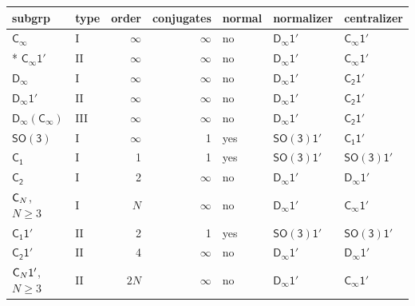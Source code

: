 \documentclass[10pt,a4paper]{article}
\makeatletter
\def\grouprule#1#2{\noalign{\marks\LTgroupmarks{\the\belowrulesep}\nobreak\vskip#1%
  \vskip\aboverulesep}\multispan\LT@cols\unskip{\leaders\hrule\@height#2\hfill\kern\z@}\cr
  \noalign{\penalty\LTrulebreak\vskip\belowrulesep\global\@lastruleclass\z@}}
\numberwithin{equation}{section}
\newcommand{\grp}[1]{\mathsf{#1}}
\makeatother
\begin{document}
{\small\begin{longtable}{@{}llrrlll@{}}\toprule
subgrp & type & order & conjugates & normal & normalizer & centralizer\\\midrule\endhead
\bottomrule\endfoot\endlastfoot
\href{../../../rotation/data/pdf/Cinf.pdf}{$\grp{C_{\infty}}$} & I & $\infty$ & $\infty$ & no & \href{Dinf-1p.pdf}{$\grp{D_{\infty}1'}$} & \href{Cinf-1p.pdf}{$\grp{C_{\infty}1'}$}\\*
\href{Cinf-1p.pdf}{$\grp{C_{\infty}1'}$} & II & $\infty$ & $\infty$ & no & \href{Dinf-1p.pdf}{$\grp{D_{\infty}1'}$} & \href{Cinf-1p.pdf}{$\grp{C_{\infty}1'}$}\\
\href{../../../rotation/data/pdf/Dinf.pdf}{$\grp{D_{\infty}}$} & I & $\infty$ & $\infty$ & no & \href{Dinf-1p.pdf}{$\grp{D_{\infty}1'}$} & \href{C2-1p.pdf}{$\grp{C_{2}1'}$}\\
\href{Dinf-1p.pdf}{$\grp{D_{\infty}1'}$} & II & $\infty$ & $\infty$ & no & \href{Dinf-1p.pdf}{$\grp{D_{\infty}1'}$} & \href{C2-1p.pdf}{$\grp{C_{2}1'}$}\\
\href{Dinf-Cinf.pdf}{$\grp{D_{\infty}}(\grp{C_{\infty}})$} & III & $\infty$ & $\infty$ & no & \href{Dinf-1p.pdf}{$\grp{D_{\infty}1'}$} & \href{C2-1p.pdf}{$\grp{C_{2}1'}$}\\
\href{../../../rotation/data/pdf/SO3.pdf}{$\grp{SO(3)}$} & I & $\infty$ & 1 & yes & \href{SO3-1p.pdf}{$\grp{SO(3)1'}$} & \href{C1-1p.pdf}{$\grp{C_{1}1'}$}\\
\grouprule{0pt}{\lightrulewidth}
\href{../../../rotation/data/pdf/C1.pdf}{$\grp{C_{1}}$} & I & 1 & 1 & yes & \href{SO3-1p.pdf}{$\grp{SO(3)1'}$} & \href{SO3-1p.pdf}{$\grp{SO(3)1'}$}\\
\href{../../../rotation/data/pdf/C2.pdf}{$\grp{C_{2}}$} & I & 2 & $\infty$ & no & \href{Dinf-1p.pdf}{$\grp{D_{\infty}1'}$} & \href{Dinf-1p.pdf}{$\grp{D_{\infty}1'}$}\\
$\grp{C_{\mathnormal{N}}}$, $N \ge 3$ & I & $N$ & $\infty$ & no & \href{Dinf-1p.pdf}{$\grp{D_{\infty}1'}$} & \href{Cinf-1p.pdf}{$\grp{C_{\infty}1'}$}\\
\href{C1-1p.pdf}{$\grp{C_{1}1'}$} & II & 2 & 1 & yes & \href{SO3-1p.pdf}{$\grp{SO(3)1'}$} & \href{SO3-1p.pdf}{$\grp{SO(3)1'}$}\\
\href{C2-1p.pdf}{$\grp{C_{2}1'}$} & II & 4 & $\infty$ & no & \href{Dinf-1p.pdf}{$\grp{D_{\infty}1'}$} & \href{Dinf-1p.pdf}{$\grp{D_{\infty}1'}$}\\
$\grp{C_{\mathnormal{N}}1'}$, $N \ge 3$ & II & $2N$ & $\infty$ & no & \href{Dinf-1p.pdf}{$\grp{D_{\infty}1'}$} & \href{Cinf-1p.pdf}{$\grp{C_{\infty}1'}$}\\

\end{longtable}}
\end{document}
